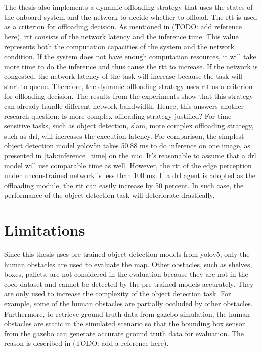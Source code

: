 The thesis also implements a dynamic offloading strategy that uses the states of the onboard system and the network to decide whether to offload. The \gls{rtt} is used as a criterion for offloading decision. As mentioned in (TODO: add reference here), \gls{rtt} consists of the network latency and the inference time. This value represents both the computation capacities of the system and the network condition. If the system does not have enough computation resources, it will take more time to do the inference and thus cause the \gls{rtt} to increase. If the network is congested, the network latency of the task will increase because the task will start to queue. Therefore, the dynamic offloading strategy uses \gls{rtt} as a criterion for offloading decision. The results from the experiments show that this strategy can already handle different network bandwidth. Hence, this answers another research question: Is more complex offloading strategy justified? For time-sensitive tasks, such as object detection, \gls{slam}, more complex offloading strategy, such as \gls{drl}, will increases the execution latency. For comparison, the simplest object detection model \gls{yolov5}n takes 50.88 ms to do inference on one image, as presented in \cref{tab:inference_time} on the \gls{nuc}. It's reasonable to assume that a \gls{drl} model will use comparable time as well. However, the \gls{rtt} of the edge perception under unconstrained network is less than 100 ms. If a \gls{drl} agent is adopted as the offloading module, the \gls{rtt} can easily increase by 50 percent. In such case, the performance of the object detection task will deteriorate drastically. 

\section{Limitations}

Since this thesis uses pre-trained object detection models from \gls{yolov5}, only the human obstacles are used to evaluate the \gls{map}. Other obstacles, such as shelves, boxes, pallets, are not considered in the evaluation because they are not in the \gls{coco} dataset and cannot be detected by the pre-trained models accurately. They are only used to increase the complexity of the object detection task. For example, some of the human obstacles are partially occluded by other obstacles. Furthermore, to retrieve ground truth data from \gls{gazebo} simulation, the human obstacles are static in the simulated scenario so that the bounding box sensor from the \gls{gazebo} can generate accurate ground truth data for evaluation. The reason is described in (TODO: add a reference here). 


